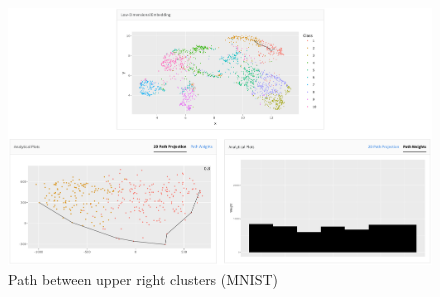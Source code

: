 \documentclass{article}
\begin{document}
\renewcommand{\figurename}{Figures}
\renewcommand{\thefigure}{3a, 3b, 3c}
\begin{figure}[t]
\centering
\includegraphics[scale=0.5]{MNIST (orange red)}
\caption{Path between upper right clusters (MNIST)}
\end{figure}


 
\newpage
\end{document}
